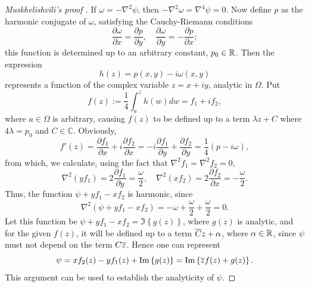 \documentclass{article}
\begin{document}
\begin{proof}[Muskhelishvili's proof \cite{musk19}]
If $\omega=-\nabla^2 \psi$, then $-\nabla^2\omega = \nabla^4\psi = 0$. Now
define $p$ as the harmonic conjugate of $\omega$, satisfying the
Cauchy-Riemann conditions
\begin{equation}
\frac{\partial\omega}{\partial x} = \frac{\partial p}{\partial y}, \quad
\frac{\partial\omega}{\partial y} = -\frac{\partial p}{\partial x};
\end{equation}
this function is determined up to an arbitrary constant, $p_0\in\mathbb{R}$. Then
the expression
\begin{equation}
h(z) = p(x,y)-i\omega(x,y)
\end{equation}
represents a function of the complex variable $z=x+iy$, analytic in $\Omega$. Put
\begin{equation}
f(z) := \frac{1}{4} \int_a^z h(w) dw = f_1 + if_2,
\end{equation}
where $a\in\Omega$ is arbitrary, causing $f(z)$ to be defined up to a term
$\lambda z +C$ where $4\lambda=p_0$ and $C\in\mathbb{C}$. Obviously,
\begin{equation}\label{eq:fprime}
f'(z) = \frac{\partial f_1}{\partial x} + i \frac{\partial f_2}{\partial x} 
   = -i \frac{\partial f_1}{\partial y} + \frac{\partial f_2}{\partial y} 
   = \frac{1}{4} \left(p-i\omega\right),
\end{equation}
from which, we calculate, using the fact that $\nabla^2 f_1=\nabla^2 f_2=0$,
\begin{equation}
\nabla^2\left(y f_1\right) = 2\frac{\partial f_1}{\partial y} 
   = \frac{\omega}{2},\quad \nabla^2\left(x f_2\right) 
   = 2\frac{\partial f_2}{\partial x} = -\frac{\omega}{2}.
\end{equation}
Thus, the function $\psi + yf_1 - xf_2$ is harmonic, since
\begin{equation}
\nabla^2 \left(\psi + yf_1 - xf_2\right) 
   = -\omega + \frac{\omega}{2} + \frac{\omega}{2} =0.
\end{equation}
Let this function be $\psi + yf_1 - xf_2 = \Im\left\{g(z)\right\}$, where
$g(z)$ is analytic, and for the given $f(z)$, it will be defined up to a
term ${\overline{C}}z+\alpha$, where $\alpha\in\mathbb{R}$, since $\psi$ must not
depend on the term $C{\overline{z}}$. Hence one can represent
\begin{equation}
\psi = x f_2(z) -y f_1(z) + \Im\left\{g(z)\right\} 
     = \Im\left\{{\overline{z}}f(z) + g(z)\right\}.
\end{equation}
This argument can be used to establish the analyticity of $\psi$.
\end{proof}
\end{document}
